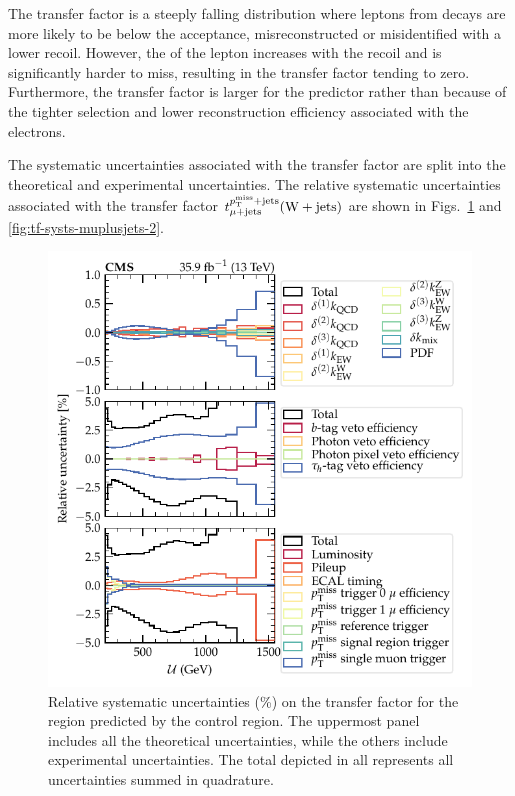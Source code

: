 The transfer factor is a steeply falling distribution where leptons from \PW decays are more likely to be below the \pt acceptance, misreconstructed or misidentified with a lower recoil. However, the \pt of the lepton increases with the recoil and is significantly harder to miss, resulting in the transfer factor tending to zero. Furthermore, the transfer factor is larger for the \eleplusjets predictor rather than \muplusjets because of the tighter selection and lower reconstruction efficiency associated with the electrons.

The systematic uncertainties associated with the \muplusjets transfer factor are split into the theoretical and experimental uncertainties. The relative systematic uncertainties associated with the transfer factor $t_{\mu+\mathrm{jets}}^{p_{\text{T}}^{\mathrm{miss}}+\mathrm{jets}}({\mathrm{W}+\mathrm{jets}})$ are shown in Figs.~\ref{fig:tf-systs-muplusjets-1} and \ref{fig:tf-systs-muplusjets-2}.
%
\begin{figure}
    \centering
    \includegraphics{chapters/042_backgrounds/images/tf_wj_mu_met_systs1.pdf}
    \caption[Theoretical uncertainty on the transfer factors]{
        Relative systematic uncertainties (\%) on the \IWj transfer factor for the \metplusjets region predicted by the \muplusjets control region. The uppermost panel includes all the theoretical uncertainties, while the others include experimental uncertainties. The total depicted in all represents all uncertainties summed in quadrature.
    }
    \label{fig:tf-systs-muplusjets-1}
\end{figure}
